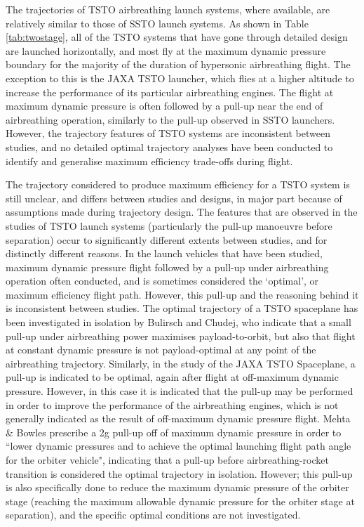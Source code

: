 The trajectories of TSTO airbreathing launch systems, where available, are relatively similar to those of SSTO launch systems. As shown in Table \ref{tab:twostage}, all of the TSTO systems that have gone through detailed design are launched horizontally, and most fly at the maximum dynamic pressure boundary for the majority of the duration of hypersonic airbreathing flight\cite{Wilhite1991, Mehta2001, Takahashi1997, Eklund2012,Bulirsch1995,Bradford2002}. The exception to this is the JAXA TSTO launcher\cite{Fujikawa2017}, which flies at a higher altitude to increase the performance of its particular airbreathing engines. The flight at maximum dynamic pressure is often followed by a pull-up near the end of airbreathing operation, similarly to the pull-up observed in SSTO launchers\cite{Wilhite1991, Fujikawa2017, Mehta2001, Takahashi1997, Eklund2012}. 
However, the trajectory features of TSTO systems are inconsistent between studies, and no detailed optimal trajectory analyses have been conducted to identify and generalise maximum efficiency trade-offs during flight. 

The trajectory considered to produce maximum efficiency for a TSTO system is still unclear, and differs between studies and designs, in major part because of assumptions made during trajectory design. 
The features that are observed in the studies of TSTO launch systems (particularly the pull-up manoeuvre before separation) occur to significantly different extents between studies, and for distinctly different reasons. 
In the launch vehicles that have been studied, maximum dynamic pressure flight followed by a pull-up under airbreathing operation often conducted\cite{Wilhite1991, Mehta2001, Takahashi1997, Eklund2012}, and is sometimes considered the `optimal', or maximum efficiency flight path\cite{Bulirsch1995,Fujikawa2017,Mehta2001}. However, this pull-up and the reasoning behind it is inconsistent between studies.
The optimal trajectory of a TSTO spaceplane has been investigated in isolation by Bulirsch and Chudej\cite{Bulirsch1995}, who indicate that a small pull-up under airbreathing power maximises payload-to-orbit, but also that flight at constant dynamic pressure is not payload-optimal at any point of the airbreathing trajectory. Similarly, in the study of the JAXA TSTO Spaceplane\cite{Fujikawa2017}, a pull-up is indicated to be optimal, again after flight at off-maximum dynamic pressure. However, in this case it is indicated that the pull-up may be performed in order to improve the performance of the airbreathing engines, which is not generally indicated as the result of off-maximum dynamic pressure flight. 
Mehta \& Bowles\cite{Mehta2001} prescribe a 2g pull-up off of maximum dynamic pressure in order to ``lower dynamic pressures and to achieve the optimal launching flight path angle for the orbiter vehicle", indicating that a pull-up before airbreathing-rocket transition is considered the optimal trajectory in isolation. However; this pull-up is also specifically done to reduce the maximum dynamic pressure of the orbiter stage (reaching the maximum allowable dynamic pressure for the orbiter stage at separation), and the specific optimal conditions are not investigated. 

